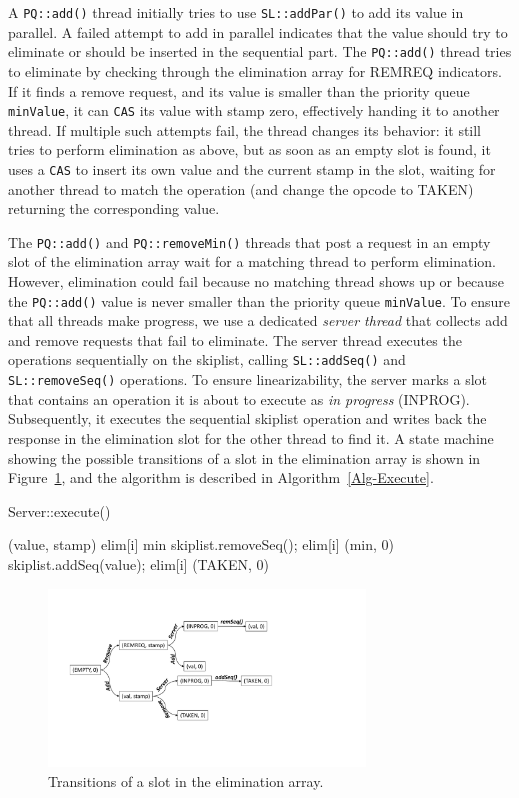 A \texttt{PQ::add()} thread initially tries to use \texttt{SL::addPar()} to add its value in parallel. A failed attempt to add in parallel indicates that the value should try to eliminate or should be inserted in the sequential part. The \texttt{PQ::add()} thread tries to eliminate by checking through the elimination array for REMREQ indicators. If it finds a remove request, and its value is smaller than the priority queue \texttt{minValue}, it can \texttt{CAS} its value with stamp zero, effectively handing it to another thread. If multiple such attempts fail, the thread changes its behavior: it still tries to perform elimination as above, but as soon as an empty slot is found, it uses a \texttt{CAS} to insert its own value and the current stamp in the slot, waiting for another thread to match the operation (and change the opcode to TAKEN) returning the corresponding value.

The \texttt{PQ::add()} and \texttt{PQ::removeMin()} threads that post a request in an empty slot of the elimination array wait for a matching thread to perform elimination. However, elimination could fail because no matching thread shows up or because the \texttt{PQ::add()} value is never smaller than the priority queue \texttt{minValue}. To ensure that all threads make progress, we use a dedicated \emph{server thread} that collects add and remove requests that fail to eliminate. 
The server thread executes the operations sequentially on the skiplist, calling \texttt{SL::addSeq()} and \texttt{SL::removeSeq()} operations. To ensure linearizability, the server marks a slot that contains an operation it is about to execute as \emph{in progress} (INPROG). Subsequently, it executes the sequential skiplist operation and writes back the response in the elimination slot for the other thread to find it. A state machine showing the possible transitions of a slot in the elimination array is shown in Figure~\ref{fig:transitions}, and the algorithm is described in Algorithm~\ref{Alg-Execute}.

\begin{algorithm}[htb]
\caption{Server::execute()}
\label{Alg-Execute}
\begin{algorithmic}[1]
	\State (value, stamp) \attr elim[i]
		\State min \attr skiplist.removeSeq(); elim[i] \attr (min, 0)
	    \EndIf
	\EndIf
		\State skiplist.addSeq(value); elim[i] \attr (TAKEN, 0)
	    \EndIf    
	\EndIf
  \EndFor
\EndWhile
\end{algorithmic}
\end{algorithm}

\begin{figure}
  \centering
	  \includegraphics[width=0.75\textwidth]{img/combining-state.pdf}
\caption{Transitions of a slot in the elimination array.}
\label{fig:transitions}
\end{figure}
